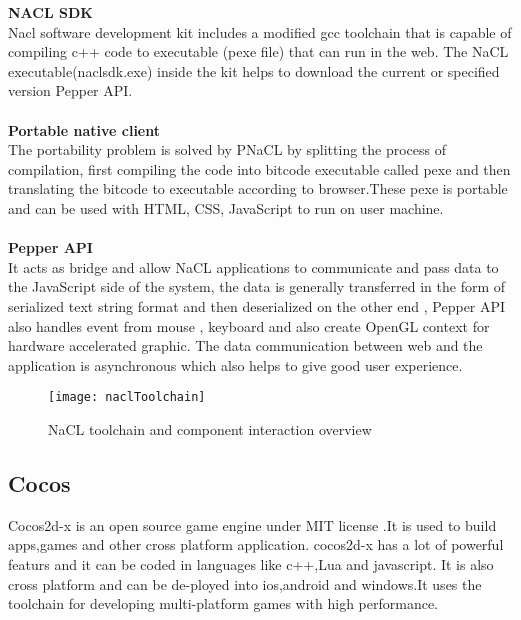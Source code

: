 \documentclass[23pt]{article}
\begin{document}
{  \textbf{NACL SDK}  \\ Nacl software development kit includes a modified gcc toolchain that is capable of compiling c++ code to executable (pexe file) that can run in the web. The NaCL executable(naclsdk.exe) inside the kit helps to download the current or specified version Pepper API. \\ \\  \textbf{ Portable native client} \\ The portability problem is solved by PNaCL by splitting the process of compilation, first compiling the code into bitcode executable called pexe and then translating the bitcode to executable according to browser.These pexe is portable and can be used with HTML, CSS, JavaScript to run on user machine.\\  \\   \textbf{Pepper API} \\ It acts as bridge and allow NaCL applications to communicate and pass data to the JavaScript side of the system, the data is generally transferred in the form of serialized text string format and then deserialized on the other end , Pepper API also handles event from mouse , keyboard and also create OpenGL context for hardware accelerated graphic. The data communication between web and the application is asynchronous which also helps to give good user experience.\\    \par}

\begin{figure}[h]
\caption{NaCL toolchain and component interaction overview \cite{nacldiagram}}
\centering
\texttt{[image: naclToolchain]}
\end{figure}

\newpage

\subsection{Cocos }

{\Large  Cocos2d-x is an open source game engine under MIT license .It is used to build apps,games and other cross platform application. cocos2d-x has a lot of powerful featurs and it can be coded in languages like c++,Lua and javascript. It is also cross platform and can be de-ployed into ios,android and windows.It uses the toolchain for developing multi-platform games with high performance. \cite{cocosBack} \par}
\end{document}

